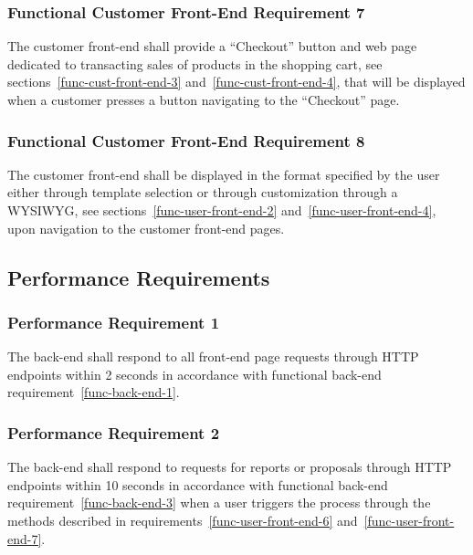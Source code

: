 \documentclass{article}
\begin{document}
\subsubsection{Functional Customer Front-End Requirement 7}
\label{func-cust-front-end-7}

The customer front-end shall provide a ``Checkout'' button and web page
dedicated to transacting sales of products in the shopping cart, see
sections~\ref{func-cust-front-end-3} and~\ref{func-cust-front-end-4}, that
will be displayed when a customer presses a button navigating to the ``Checkout''
page.

\subsubsection{Functional Customer Front-End Requirement 8}
\label{func-cust-front-end-8}

The customer front-end shall be displayed in the format specified by the user
either through template selection or through customization through a WYSIWYG,
see sections~\ref{func-user-front-end-2} and~\ref{func-user-front-end-4}, upon
navigation to the customer front-end pages.

\pagebreak
\subsection{Performance Requirements}

\subsubsection{Performance Requirement 1}
\label{perf-back-end-1}

The back-end shall respond to all front-end page requests through HTTP endpoints
within 2 seconds in accordance with functional back-end
requirement~\ref{func-back-end-1}.

\subsubsection{Performance Requirement 2}
\label{perf-back-end-2}

The back-end shall respond to requests for reports or proposals through HTTP
endpoints within 10 seconds in accordance with functional back-end
requirement~\ref{func-back-end-3} when a user triggers the process through the
methods described in requirements~\ref{func-user-front-end-6}
and~\ref{func-user-front-end-7}.
\end{document}
